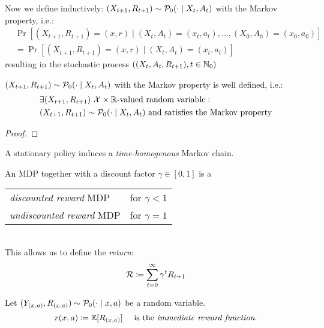 Now we define inductively: \((X_{t+1}, R_{t+1})\sim\mathcal{P}_0(\cdot\mid X_t, A_t)\) with the Markov property, i.e.:
\begin{align*} 
&\Pr[(X_{t+1},R_{t+1})=(x,r) \mid (X_t,A_t)=(x_t,a_t),\dots, (X_0,A_0)=(x_0,a_0)]\\
&=\Pr[(X_{t+1}, R_{t+1})=(x,r)\mid (X_t,A_t)=(x_t,a_t)]
\end{align*}
resulting in the stochastic process \(((X_t,A_t,R_{t+1}), t\in \mathbb{N}_0)\)
\begin{remark}
	\((X_{t+1}, R_{t+1})\sim\mathcal{P}_0(\cdot\mid X_t, A_t)\) with the Markov property is well defined, i.e.:
	\begin{align*}
		&\exists (X_{t+1}, R_{t+1})\ \mathcal{X}\times\mathbb{R}\text{-valued random variable}: \\ 
		&(X_{t+1}, R_{t+1})\sim\mathcal{P}_0(\cdot\mid X_t, A_t) \text{ and satisfies the Markov property}
	\end{align*}
\end{remark}
\begin{proof}
\end{proof}

\begin{remark}
	A stationary policy induces a \emph{time-homogenous} Markov chain.
\end{remark}

\begin{definition}
An MDP together with a discount factor \(\gamma\in[0,1]\) is a
\par\begin{tabular}{l l}
	\emph{discounted reward} MDP & for \(\gamma <1 \)\\
	\emph{undiscounted reward} MDP & for \(\gamma=1 \)
\end{tabular}\\
This allows us to define the \emph{return}:
\[\mathcal{R}\coloneqq\sum_{t=0}^{\infty}\gamma^t R_{t+1}\]
\end{definition}

\begin{definition}
Let \((Y_{(x,a)}, R_{(x,a)})\sim \mathcal{P}_0(\cdot\mid x,a) \) be a random variable.
\[r(x,a)\coloneqq \mathbb{E}[R_{(x,a)}] \quad\text{ is the \emph{immediate reward function}.}\]
\end{definition}

